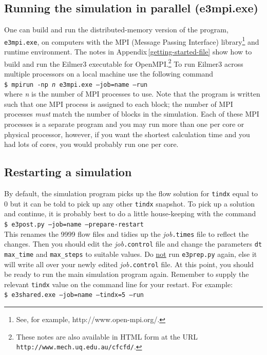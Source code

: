\documentclass[12pt,a4paper,twoside]{article}
\begin{document}
\subsection{Running the simulation in parallel (e3mpi.exe)}
%
One can build and run the distributed-memory version of the program, 
\texttt{e3mpi.exe}, on computers with 
the MPI (Message Passing Interface) library\footnote{See, for example, http://www.open-mpi.org/.} 
and runtime environment.
The notes in Appendix\,\ref{getting-started-file} show how to build and run 
the Eilmer3 executable for OpenMPI.\footnote{These notes are also available in HTML form at the URL
\texttt{http://www.mech.uq.edu.au/cfcfd/}.}
To run Eilmer3 across multiple processors
on a local machine use the following command\\
\texttt{\$ mpirun -np \textit{n} e3mpi.exe --job=name --run}\\
where \textit{n} is the number of MPI processes to use.
Note that the program is written such that one MPI process is assigned to each block; 
the number of MPI processes \emph{must} match the number of blocks in the simulation.
Each of these MPI processes is a separate program and you may run more than one per core 
or physical processor, however, if you want the shortest calculation time and you had lots of cores,
you would probably run one per core.

\subsection{Restarting a simulation}
%
By default, the simulation program picks up the flow solution for \texttt{tindx} equal to 0 but
it can be told to pick up any other \texttt{tindx} snapshot.
To pick up a solution and continue, it is probably best to do a little house-keeping with the command\\
\texttt{\$ e3post.py --job=name --prepare-restart}\\
This renames the 9999 flow files and tidies up the \textit{job}\texttt{.times} file to reflect the changes.
Then you should edit the \textit{job}\texttt{.control} file and change the parameters \texttt{dt}
\texttt{max\_time} and \texttt{max\_steps} to suitable values.
Do \underline{not} run \texttt{e3prep.py} again, else it will write all over 
your newly edited \textit{job}\texttt{.control} file.
At this point, you should be ready to run the main simulation program again.
Remember to supply the relevant \texttt{tindx} value on the command line for your restart.
For example:\\
\texttt{\$ e3shared.exe --job=name --tindx=5 --run}
\end{document}
